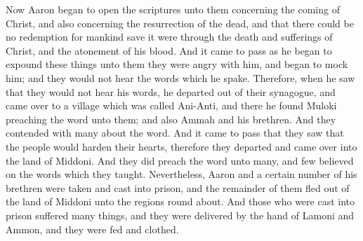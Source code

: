 \bverse \iffalse Now Aaron began to open the scriptures unto them concerning the coming of Christ, and also concerning the resurrection of the dead, and that there could be no redemption for mankind save it were through the death and sufferings of Christ, and the atonement of his blood. \fi
Now Aaron began to open the scriptures unto them concerning the coming of Christ, and also concerning the resurrection of the dead, and that there could be no redemption for mankind save it were through the death and sufferings of Christ, and the atonement of his blood.
\bverse \iffalse And it came to pass as he began to expound these things unto them they were angry with him, and began to mock him; and they would not hear the words which he spake. \fi
And it came to pass as he began to expound these things unto them they were angry with him, and began to mock him; and they would not hear the words which he spake.
\bverse \iffalse Therefore, when he saw that they would not hear his words, he departed out of their synagogue, and came over to a village which was called Ani-Anti, and there he found Muloki preaching the word unto them; and also Ammah and his brethren. And they contended with many about the word. \fi
Therefore, when he saw that they would not hear his words, he departed out of their synagogue, and came over to a village which was called Ani-Anti, and there he found Muloki preaching the word unto them; and also Ammah and his brethren. And they contended with many about the word.
\bverse \iffalse And it came to pass that they saw that the people would harden their hearts, therefore they departed and came over into the land of Middoni. And they did preach the word unto many, and few believed on the words which they taught. \fi
And it came to pass that they saw that the people would harden their hearts, therefore they departed and came over into the land of Middoni. And they did preach the word unto many, and few believed on the words which they taught.
\bverse \iffalse Nevertheless, Aaron and a certain number of his brethren were taken and cast into prison, and the remainder of them fled out of the land of Middoni unto the regions round about. \fi
Nevertheless, Aaron and a certain number of his brethren were taken and cast into prison, and the remainder of them fled out of the land of Middoni unto the regions round about.
\bverse \iffalse And those who were cast into prison suffered many things, and they were delivered by the hand of Lamoni and Ammon, and they were fed and clothed. \fi
And those who were cast into prison suffered many things, and they were delivered by the hand of Lamoni and Ammon, and they were fed and clothed.
